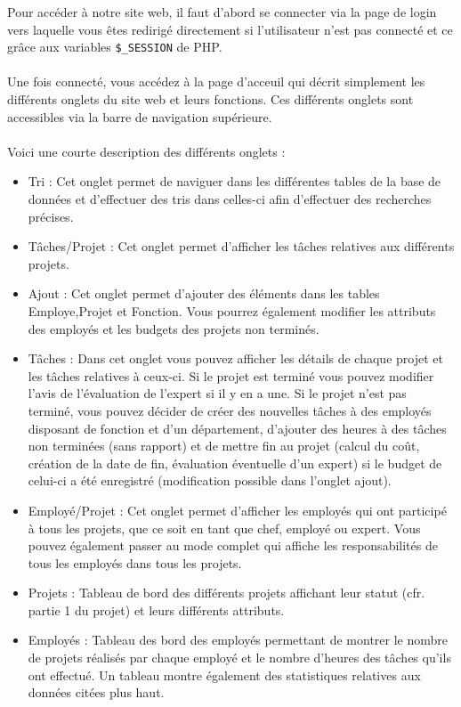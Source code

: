 Pour accéder à notre site web, il faut d'abord se connecter via la page de login vers laquelle vous êtes redirigé directement si l'utilisateur n'est pas connecté et ce grâce 
aux variables \verb|$_SESSION| de PHP.
\\\\
Une fois connecté, vous accédez à la page d'acceuil qui décrit simplement les différents onglets du site web et leurs fonctions. Ces différents onglets sont accessibles via la barre de navigation supérieure.
\\\\
Voici une courte description des différents onglets :

\begin{itemize}
  \item Tri : Cet onglet permet de naviguer dans les différentes tables de la base de données et d'effectuer des tris dans celles-ci afin d'effectuer des recherches précises.
  \item Tâches/Projet : Cet onglet permet d'afficher les tâches relatives aux différents projets.
  \item Ajout : Cet onglet permet d'ajouter des éléments dans les tables Employe,Projet et Fonction. Vous pourrez également modifier les attributs des employés et les budgets des projets non terminés.
  \item Tâches : Dans cet onglet vous pouvez afficher les détails de chaque projet et les tâches relatives à ceux-ci. Si le projet est terminé vous pouvez modifier l'avis de l'évaluation de l'expert si il y en a une. Si le projet n'est pas terminé, vous pouvez décider de créer des nouvelles tâches à des employés disposant de fonction et d'un département, d'ajouter des heures à des tâches non terminées (sans rapport) et de mettre fin au projet (calcul du coût, création de la date de fin, évaluation éventuelle d'un expert) si le budget de celui-ci a été enregistré (modification possible dans l'onglet ajout).
  \item Employé/Projet : Cet onglet permet d'afficher les employés qui ont participé à tous les projets, que ce soit en tant que chef, employé ou expert. Vous pouvez également passer au mode complet qui affiche les responsabilités de tous les employés dans tous les projets.
  \item Projets : Tableau de bord des différents projets affichant leur statut (cfr. partie 1 du projet) et leurs différents attributs.
  \item Employés : Tableau des bord des employés permettant de montrer le nombre de projets réalisés par chaque employé et le nombre d'heures des tâches qu'ils ont effectué. Un tableau montre également des statistiques relatives aux données citées plus haut.
\end{itemize}
